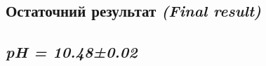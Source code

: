 \documentclass[11pt]{article}
\begin{document}
    \subsection{\texorpdfstring{Остаточний результат \emph{(Final
result)}}{Остаточний результат (Final result)}}\label{ux43eux441ux442ux430ux442ux43eux447ux43dux438ux439-ux440ux435ux437ux443ux43bux44cux442ux430ux442-final-result}

    \subsection{\texorpdfstring{\textbf{\emph{pH =
10.48±0.02}}}{pH = 10.48±0.02}}\label{ph-10.480.02}


    
    
    
\end{document}

